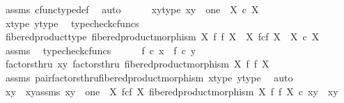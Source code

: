 \begin{isabellebody}
\ assms{\isacharparenleft}{\kern0pt}{}{\isacharparenright}{\kern0pt}\ cfunc{\isacharunderscore}{\kern0pt}type{\isacharunderscore}{\kern0pt}def\ \isamarkupfalse%
\ auto\isanewline
\isanewline
\ \ \ \ \isamarkupfalse%
\ x{\isacharunderscore}{\kern0pt}y{\isacharunderscore}{\kern0pt}type{\isacharcolon}{\kern0pt}\ {\isachardoublequoteopen}{\isasymlangle}x{\isacharcomma}{\kern0pt}y{\isasymrangle}\ {\isacharcolon}{\kern0pt}\ one\ {\isasymrightarrow}\ X\ {\isasymtimes}\isactrlsub c\ X{\isachardoublequoteclose}\isanewline
\ \ \ \ \ \ \isamarkupfalse%
\ x{\isacharunderscore}{\kern0pt}type{}\ y{\isacharunderscore}{\kern0pt}type{}\ \isamarkupfalse%
\ {\isacharparenleft}{\kern0pt}typecheck{\isacharunderscore}{\kern0pt}cfuncs{\isacharparenright}{\kern0pt}\isanewline
\ \ \ \ \isamarkupfalse%
\ fibered{\isacharunderscore}{\kern0pt}product{\isacharunderscore}{\kern0pt}type{\isacharcolon}{\kern0pt}\ {\isachardoublequoteopen}fibered{\isacharunderscore}{\kern0pt}product{\isacharunderscore}{\kern0pt}morphism\ X\ f\ f\ X\ {\isacharcolon}{\kern0pt}\ X\ \isactrlbsub f\isactrlesub {\isasymtimes}\isactrlsub c\isactrlbsub f\isactrlesub \ X\ {\isasymrightarrow}\ X\ {\isasymtimes}\isactrlsub c\ X{\isachardoublequoteclose}\isanewline
\ \ \ \ \ \ \isamarkupfalse%
\ assms\ \isamarkupfalse%
\ typecheck{\isacharunderscore}{\kern0pt}cfuncs\isanewline
\isanewline
\ \ \ \ \isamarkupfalse%
\ {\isachardoublequoteopen}f\ {\isasymcirc}\isactrlsub c\ x\ {\isacharequal}{\kern0pt}\ f\ {\isasymcirc}\isactrlsub c\ y{\isachardoublequoteclose}\isanewline
\ \ \ \ \isamarkupfalse%
\ \isamarkupfalse%
\ factorsthru{\isacharcolon}{\kern0pt}\ {\isachardoublequoteopen}{\isasymlangle}x{\isacharcomma}{\kern0pt}y{\isasymrangle}\ factorsthru\ fibered{\isacharunderscore}{\kern0pt}product{\isacharunderscore}{\kern0pt}morphism\ X\ f\ f\ X{\isachardoublequoteclose}\isanewline
\ \ \ \ \ \ \isamarkupfalse%
\ assms{\isacharparenleft}{\kern0pt}{}{\isacharparenright}{\kern0pt}\ pair{\isacharunderscore}{\kern0pt}factorsthru{\isacharunderscore}{\kern0pt}fibered{\isacharunderscore}{\kern0pt}product{\isacharunderscore}{\kern0pt}morphism\ x{\isacharunderscore}{\kern0pt}type{}\ y{\isacharunderscore}{\kern0pt}type{}\ \isamarkupfalse%
\ auto\isanewline
\ \ \ \ \isamarkupfalse%
\ \isamarkupfalse%
\ xy\ \ xy{\isacharunderscore}{\kern0pt}assms{\isacharcolon}{\kern0pt}\ {\isachardoublequoteopen}xy\ {\isacharcolon}{\kern0pt}\ one\ {\isasymrightarrow}\ X\ \isactrlbsub f\isactrlesub {\isasymtimes}\isactrlsub c\isactrlbsub f\isactrlesub \ X{\isachardoublequoteclose}\ {\isachardoublequoteopen}fibered{\isacharunderscore}{\kern0pt}product{\isacharunderscore}{\kern0pt}morphism\ X\ f\ f\ X\ {\isasymcirc}\isactrlsub c\ xy\ {\isacharequal}{\kern0pt}\ {\isasymlangle}x{\isacharcomma}{\kern0pt}y{\isasymrangle}{\isachardoublequoteclose}\isanewline

\end{isabellebody}
